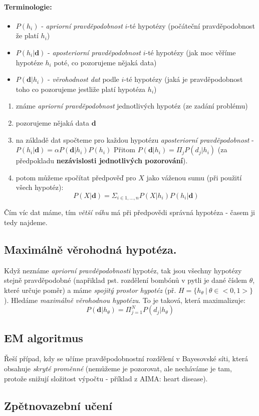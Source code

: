 \documentclass[a4paper]{article}      %
\begin{document}
\paragraph{Terminologie:}
\begin{itemize}
\item $P(h_i)$ - \emph{apriorní pravděpodobnost} $i$-té hypotézy (počáteční pravděpodobnost že platí $h_i$)
\item $P(h_i|\mathbf{d})$ - \emph{aposteriorní pravděpodobnost} $i$-té hypotézy (jak moc věříme hypotéze $h_i$ poté, co pozorujeme nějaká data)
\item $P(\mathbf{d}|h_{i})$ - \emph{věrohodnost dat} podle $i$-té hypotézy (jaká je pravděpodobnost toho co pozorujeme jestliže platí hypotéza $h_i$)
\end{itemize}

\begin{enumerate}
\item známe \emph{apriorní pravděpodobnost} jednotlivých hypotéz (ze zadání problému)
\item pozorujeme nějaká data $\textbf{d}$
\item na základě dat spočteme pro každou hypotézu \emph{aposteriorní pravděpodobnost} - $P(h_{i}|\mathbf{d}) = \alpha P(\mathbf{d}|h_i)P(h_i)$
Přitom $P(\mathbf{d}|h_i) = \Pi_{j} P(d_j|h_i)$ (za předpokladu \textbf{nezávislosti jednotlivých pozorování}). 
\item potom můžeme spočítat předpověď pro $X$ jako váženou sumu (při použití všech hypotéz):
\[
P(X|\mathbf{d}) = \Sigma_{i \in 1,\ldots,n} P(X|h_{i})P(h_i|\mathbf{d})
\]
\end{enumerate}

Čím víc dat máme, tím \emph{větší váhu} má při předpovědi správná hypotéza - časem ji tedy najdeme.

\subsection{Maximálně věrohodná hypotéza.}
Když neznáme \emph{apriorní pravděpodobnosti} hypotéz, tak jsou všechny hypotézy stejně pravděpodobné
(napřiklad pst. rozdělení bombónů v pytli je dané číslem $\theta$, které určuje poměr) a máme \emph{spojitý prostor hypotéz} (př. $H=\lbrace h_{\theta}\ |\ \theta \in <0,1> \rbrace$). Hledáme \emph{maximálně věrohodnou hypotézu}. To je taková, která maximalizuje:
\[
P(\mathbf{d}|h_{\theta}) = \Pi_{j = 1}^{N} P(d_j|h_{\theta})
\]

\subsection{EM algoritmus}
Řeší případ, kdy se učíme pravděpodobnostní rozdělení v Bayesovské síti, která obsahuje \emph{skryté proměnné} (nemůžeme je pozorovat, ale necháváme je tam, protože snižují složitost výpočtu - příklad z AIMA: heart disease). 

\subsection{Zpětnovazební učení}
\end{document}
